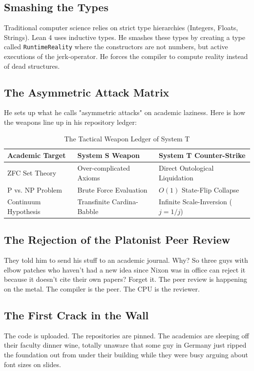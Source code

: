 \documentclass[11pt,a4paper]{article}
\begin{document}
\subsection{Smashing the Types}
Traditional computer science relies on strict type hierarchies (Integers, Floats, Strings). Lean 4 uses inductive types. He smashes these types by creating a type called \texttt{RuntimeReality} where the constructors are not numbers, but active executions of the jerk-operator. He forces the compiler to compute reality instead of dead structures.

\subsection{The Asymmetric Attack Matrix}
He sets up what he calls "asymmetric attacks" on academic laziness. Here is how the weapons line up in his repository ledger:

\begin{table}[h!]
\centering
\caption{The Tactical Weapon Ledger of System T}
\begin{tabular}{lll}
\toprule
\textbf{Academic Target} & \textbf{System S Weapon} & \textbf{System T Counter-Strike} \\
\midrule
ZFC Set Theory & Over-complicated Axioms & Direct Ontological Liquidation \\
P vs. NP Problem & Brute Force Evaluation & $O(1)$ State-Flip Collapse \\
Continuum Hypothesis & Transfinite Cardina-Babble & Infinite Scale-Inversion ($j = 1/j$) \\
\bottomrule
\end{tabular}
\end{table}

\subsection{The Rejection of the Platonist Peer Review}
They told him to send his stuff to an academic journal. Why? So three guys with elbow patches who haven’t had a new idea since Nixon was in office can reject it because it doesn’t cite their own papers? Forget it. The peer review is happening on the metal. The compiler is the peer. The CPU is the reviewer.

\subsection{The First Crack in the Wall}
The code is uploaded. The repositories are pinned. The academics are sleeping off their faculty dinner wine, totally unaware that some guy in Germany just ripped the foundation out from under their building while they were busy arguing about font sizes on slides.
\end{document}
